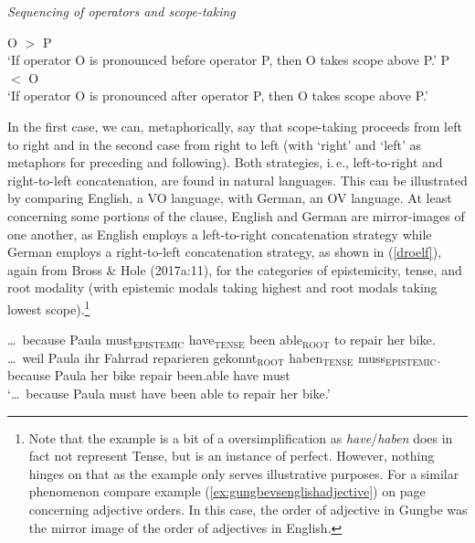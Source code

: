 \begin{exe} 
\ex \textit{Sequencing of operators and scope-taking} \label{beispielvierzehn} 
\begin{xlist} 
\ex 		O $>$ P \\ `If operator O is pronounced before operator P, then O takes scope above P.' \label{beispielvierzehna}
\ex P $<$ O \\ `If operator O is pronounced after operator P, then O takes scope above P.' \label{beispielvierzehnb} 
\end{xlist} 
\end{exe}

\noindent In the first case, we can, metaphorically, say that scope-taking proceeds from left to right and in the second case from right to left (with `right' and `left' as metaphors for preceding and following). Both strategies, i.\,e., left-to-right and right-to-left concatenation, are found in natural languages. This can be illustrated by comparing English, a VO language, with German, an OV language. At least concerning some portions of the clause, English and German are mirror-images of one another, as English employs a  left-to-right concatenation strategy while German employs a right-to-left concatenation strategy, as shown in (\ref{droelf}), again from Bross \& Hole (2017a:11), for the categories of epistemicity, tense, and root modality (with epistemic modals taking highest and root modals taking lowest scope).\footnote{ Note that the example is a bit of a oversimplification as \textit{have}/\textit{haben} does in fact not represent Tense, but is an instance of perfect. However, nothing hinges on that as the example only serves illustrative purposes. For a similar phenomenon compare example (\ref{ex:gungbevsenglishadjective}) on page \pageref{ex:gungbevsenglishadjective} concerning adjective orders. In this case, the order of adjective in Gungbe was the mirror image of the order of adjectives in English.}

\begin{exe} 
\ex \label{droelf}
\begin{xlist} 
\ex 	\dots\ because Paula must$_{\text{EPISTEMIC}}$ have$_{\text{TENSE}}$ been able$_{\text{ROOT}}$ to repair her bike.\label{beispieldreizehna}
\ex \gll \dots\ weil Paula ihr Fahrrad reparieren gekonnt$_{\text{ROOT}}$	haben$_{\text{TENSE}}$ muss$_{\text{EPISTEMIC}}$. \\
because Paula	her	bike		repair			been.able	  	have			must \\
\glt `\dots\ because Paula must have been able to repair her bike.'
 \label{beispieldreizehnb} 

\end{xlist} 
\end{exe}

